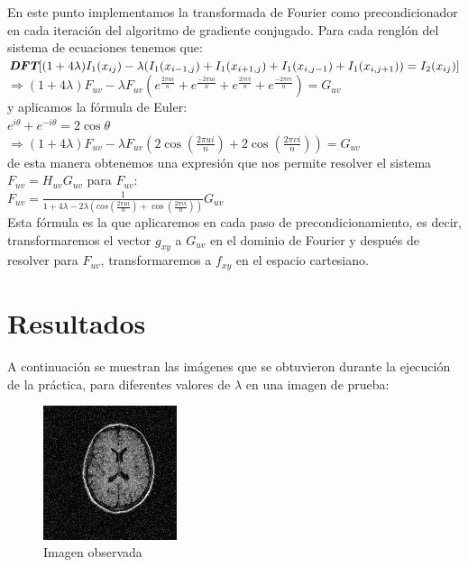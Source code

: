 \documentclass[10pt,journal,compsoc]{styles/IEEEtran}
\begin{document}
En este punto implementamos la transformada de Fourier como precondicionador en cada iteración del algoritmo de gradiente conjugado. Para cada renglón del sistema de ecuaciones tenemos que:\\

$\emph{\textbf{DFT}}[(1+4\lambda)I_1(x_{ij})-\lambda(I_1(x_{i-1,j})+I_1(x_{i+1,j})
+I_1(x_{i,j-1})+I_1(x_{i,j+1}))=I_2(x_{ij})]$\\

$\Rightarrow (1+4\lambda)F_{uv}-\lambda F_{uv}(e^{\frac{2\pi ui}{n}}+e^{\frac{-2\pi ui}{n}}+e^{\frac{2\pi vi}{n}}+e^{\frac{-2\pi vi}{n}})=G_{uv}$\\

y aplicamos la f\'ormula de Euler:\\

$e^{i\theta}+e^{-i\theta}=2 \cos \theta$\\

$\Rightarrow(1+4\lambda)F_{uv}-\lambda F_{uv}(2\cos(\frac{2\pi ui}{n})+2\cos(\frac{2\pi vi}{n}))=G_{uv}$\\

de esta manera obtenemos una expresión que nos permite resolver el sistema $F_{uv}=H_{uv}G_{uv}$ para $F_{uv}$:\\

$F_{uv}=\frac{1}{1+4 \lambda -2 \lambda(cos(\frac{2\pi ui}{n})+\cos(\frac{2\pi vi}{n}))}G_{uv}$\\

Esta f\'ormula es la que aplicaremos en cada paso de precondicionamiento, es decir, transformaremos el vector $g_{xy}$ a $G_{uv}$ en el dominio de Fourier y después de resolver para $F_{uv}$, transformaremos a $f_{xy}$ en el espacio cartesiano.\\


\section{Resultados}

A continuación se muestran las imágenes que se obtuvieron durante la ejecución de la práctica, para diferentes valores de $\lambda$ en una imagen de prueba:

\begin{figure}[hbtp]
\centering
\includegraphics[width=0.35\textwidth]{mri.png}
\caption{Imagen observada}
\end{figure}
\end{document}
